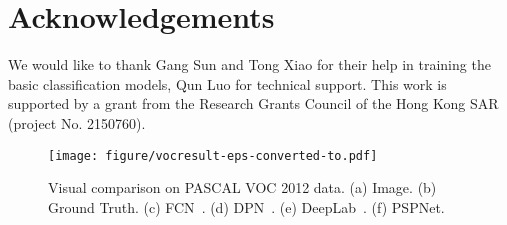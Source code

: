 \documentclass[10pt,twocolumn,letterpaper]{article}
\begin{document}
\section*{Acknowledgements}

We would like to thank Gang Sun and Tong Xiao for their help in training the basic
classification models, Qun Luo for technical support. This work is supported by a grant from the Research Grants Council
of the Hong Kong SAR (project No. 2150760).

\begin{figure*}
	\begin{center}
		\texttt{[image: figure/vocresult-eps-converted-to.pdf]}
	\end{center}
	\caption{Visual comparison on PASCAL VOC 2012 data. (a) Image. (b) Ground Truth.
		(c) FCN~\cite{long2015fully}. (d) DPN~\cite{liu2015parsenet}. (e) DeepLab~\cite{chen2016deeplab}. (f) PSPNet.}
	\label{fig:vocresult}
\end{figure*}
\end{document}
